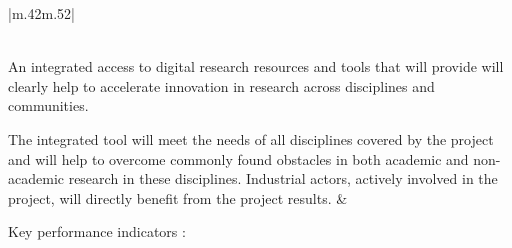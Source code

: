 \begin{supertabular}{|m{.42\textwidth}m{.52\textwidth}|}
\\\hline
\hline{}\\\hline

An integrated access to digital research
resources and tools that \TheProject will provide will clearly help to
accelerate innovation in research across disciplines and communities.

The integrated tool will meet the needs of all disciplines covered by
the project and will help to overcome commonly found obstacles in
both academic and non-academic research in these disciplines. Industrial
actors, actively involved in the project, will directly benefit from
the project results. &

Key performance indicators :


\end{supertabular}
